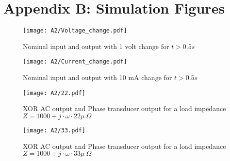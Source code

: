 \chapter{Appendix B: Simulation Figures} 

\begin{figure}[H]
    \centering
    \texttt{[image: A2/Voltage\_change.pdf]}
    \caption{Nominal input and output with 1 volt change for $t>0.5s$}
    \label{fig:nomial_voltages}
\end{figure}

\begin{figure}[H]
    \centering
    \texttt{[image: A2/Current\_change.pdf]}
     \caption{Nominal input and output with 10 mA change for $t>0.5s$}
    \label{fig:nominal_current}
\end{figure}

\begin{figure}[H]
  \centering
  \texttt{[image: A2/22.pdf]}
    \caption{XOR AC output and Phase transducer output for a load impedance \\$Z=1000+j \cdot \omega \cdot 22\mu \  \Omega$ }
    \label{fig:phase22u}
\end{figure}

 \begin{figure}[H]
  \centering
  \texttt{[image: A2/33.pdf]}
    \caption{XOR AC output and Phase transducer output for a load impedance \\$Z=1000+j \cdot \omega \cdot 33\mu \  \Omega$ }
    \label{fig:phase33u}
\end{figure}